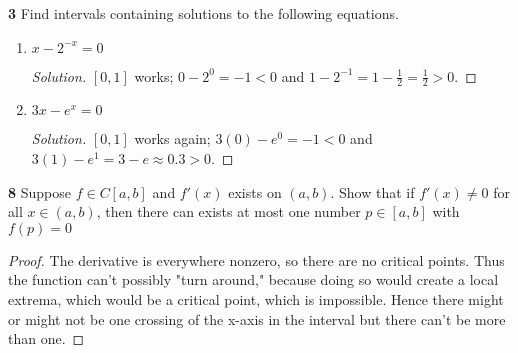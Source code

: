 \documentclass{article}
\newenvironment{solution}{\begin{proof}[Solution]}{\end{proof}}
\begin{document}

\textbf{3}  %
Find intervals containing solutions to the following equations.
\begin{enumerate}
    \item 
    $x - 2^{-x} = 0$
    \begin{solution}
        $[0, 1]$ works; $0 - 2^0 = -1 < 0$ and $1 - 2^{-1} = 1 - \frac{1}{2} = \frac{1}{2} > 0$.
    \end{solution}

    \addtocounter{enumi}{1}
    \item
    $3x - e^x = 0$
    \begin{solution}
        $[0, 1]$ works again; $3(0) - e^0 = -1 < 0$ and $3(1) - e^1 = 3 - e \approx 0.3 > 0$.
    \end{solution}
\end{enumerate}


\textbf{8} %
Suppose $f \in C[a, b]$ and $f'(x)$ exists on $(a, b)$. Show that if $f'(x) \ne 0$ for all $x \in (a, b)$, then there can exists at most one number $p \in [a, b]$ with $f(p) = 0$

\begin{proof}
    The derivative is everywhere nonzero, so there are no critical points. Thus the function can't possibly "turn around," because doing so would create a local extrema, which would be a critical point, which is impossible. Hence there might or might not be one crossing of the x-axis in the interval but there can't be more than one.
\end{proof}

\end{document}
